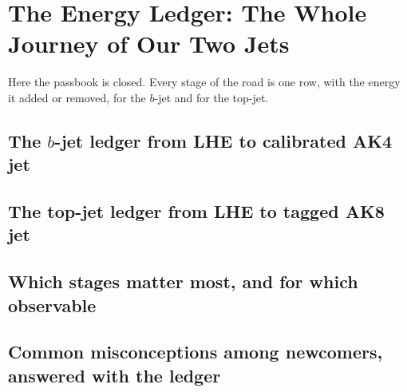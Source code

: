 \chapter{The Energy Ledger: The Whole Journey of Our Two Jets}
\label{ch:energy_ledger}

\begin{journeybox}
Here the passbook is closed. Every stage of the road is one row, with the energy
it added or removed, for the $b$-jet and for the top-jet.
\end{journeybox}


\section{The $b$-jet ledger from LHE to calibrated AK4 jet}
\label{sec:energy_ledger:the_b_jet_ledger_from_lhe_to_calibrated_}

\section{The top-jet ledger from LHE to tagged AK8 jet}
\label{sec:energy_ledger:the_top_jet_ledger_from_lhe_to_tagged_ak}

\section{Which stages matter most, and for which observable}
\label{sec:energy_ledger:which_stages_matter_most_and_for_which_o}

\section{Common misconceptions among newcomers, answered with the ledger}
\label{sec:energy_ledger:common_misconceptions_among_newcomers_an}

\begin{pitfalls}
\end{pitfalls}

\begin{exercises}
\item {}
\item {}
\end{exercises}
